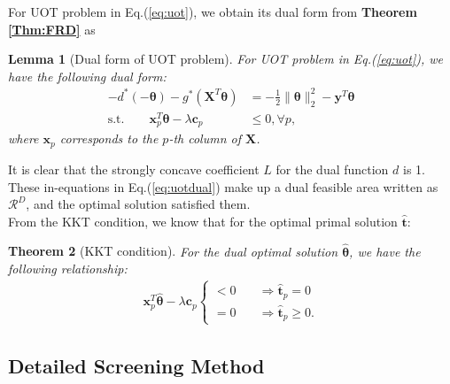\documentclass[twoside]{article}
\theoremstyle{plain}
\newtheorem{thm}{Theorem}
\newtheorem{lem}[thm]{Lemma}
\newcommand{\tranT}{T}
\newcommand{\mat}[1]{\mathbf{#1}}
\renewcommand{\vec}[1]{\bm{#1}}
\begin{document}
For UOT problem in Eq.(\ref{eq:uot}), we obtain its dual form from {\bf Theorem \ref{Thm:FRD}} as
\begin{lem}[Dual form of UOT problem]
For UOT problem in Eq.(\ref{eq:uot}), we have the following dual form:
\begin{equation}
\begin{split}
-d^*(-\vec{\theta}) - g^*(\mat{X}^{\tranT}\vec{\theta})& = -\frac{1}{2}\|\vec{\theta}\|_2^2-\vec{y}^{\tranT}\vec{\theta} \\
 \text{s.t.} \quad \quad \vec{x}_p^{\tranT}\vec{\theta} -\lambda \vec{c}_p &\leq 0, \forall p,
 \end{split}
 \label{eq:uotdual}
\end{equation}
where $\vec{x}_p $ corresponds to the $p$-th column of $\mat{X}$. 
\end{lem}
It is clear that the strongly concave coefficient $L$ for the dual function $d$ is 1. These in-equations in Eq.(\ref{eq:uotdual}) make up a dual feasible area written as $\mathcal{R}^{D}$, and the optimal solution satisfied them.\\
From the KKT condition, we know that for the optimal primal solution $\hat{\vec{t}}$:
\begin{thm}[KKT condition] For the dual optimal solution $\hat{\vec{\theta}}$, we have the following relationship:
 \begin{equation}
\begin{split}
\vec{x}_p^{\tranT}\hat{\vec{\theta}} -\lambda \vec{c}_p \left\{
\begin{aligned}
< 0 \quad& \Rightarrow \hat{\vec{t}}_p = 0\\
= 0 \quad& \Rightarrow \hat{\vec{t}}_p \geq 0.
\end{aligned}
\right.
 \end{split}
 \label{eq:kkt}
\end{equation}
\end{thm}

\subsection{Detailed Screening Method}
\end{document}
